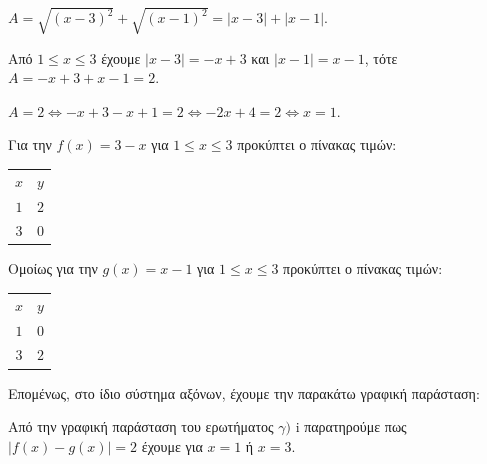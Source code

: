 
\begin{alist}
\item $A = \sqrt{(x - 3)^2} + \sqrt{(x - 1)^2} = |x - 3| + |x - 1|$.

\item 
\begin{rlist}
\item Από $1 \le x \le 3$ έχουμε $|x - 3| = -x + 3$ και $|x - 1| = x - 1$,
τότε $A = -x + 3 + x - 1 = 2$.
\item $A = 2 \Leftrightarrow -x + 3 - x + 1 = 2 \Leftrightarrow -2x + 4 = 2 \Leftrightarrow x = 1$.
\end{rlist}

\item 
\begin{rlist}
\item Για την $f(x) = 3 - x$ για $1 \le x \le 3$ προκύπτει ο πίνακας τιμών:
\begin{center}
\begin{tabular}{|c|c|}

$x$ & $y$ \\ 
$1$ & $2$ \\ 
$3$ & $0$ \\ 
\end{tabular}
\end{center}
Ομοίως για την $g(x) = x - 1$ για $1 \le x \le 3$ προκύπτει ο πίνακας τιμών:
\begin{center}
\begin{tabular}{|c|c|}

$x$ & $y$ \\ 
$1$ & $0$ \\ 
$3$ & $2$ \\ 
\end{tabular}
\end{center}
Επομένως, στο ίδιο σύστημα αξόνων, έχουμε την παρακάτω γραφική παράσταση:
\begin{center}
\end{center}

\item Από την γραφική παράσταση του ερωτήματος $\gamma)$ i παρατηρούμε πως $|f(x) - g(x)| = 2$
έχουμε για $x = 1$ ή $x = 3$.
\end{rlist}
\end{alist}

